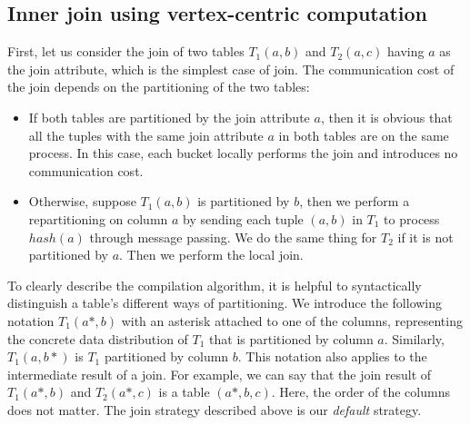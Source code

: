 \documentclass{sokendai_thesis} %
\begin{document}
\subsection{Inner join using vertex-centric computation}
\label{sec:join-two}

First, let us consider the join of two tables $T_1(a, b)$ and $T_2(a, c)$ having $a$ as the join attribute, which is the simplest case of join.
The communication cost of the join depends on the partitioning of the two tables:
\begin{itemize}
\item
  If both tables are partitioned by the join attribute $a$, then it is obvious that all the tuples with the same join attribute $a$ in both tables are on the same process.
  In this case, each bucket locally performs the join and introduces no communication cost.
\item
  Otherwise, suppose $T_1(a, b)$ is partitioned by $b$, then we perform a repartitioning on column $a$ by sending each tuple $(a, b)$ in $T_1$ to process $hash(a)$ through message passing.
  We do the same thing for $T_2$ if it is not partitioned by $a$.
  Then we perform the local join.
\end{itemize}

To clearly describe the compilation algorithm, it is helpful to syntactically distinguish a table's different ways of partitioning.
We introduce the following notation $T_1(a*, b)$ with an asterisk attached to one of the columns, representing the concrete data distribution of $T_1$ that is partitioned by column $a$.
Similarly, $T_1(a, b*)$ is $T_1$ partitioned by column $b$.
This notation also applies to the intermediate result of a join.
For example, we can say that the join result of $T_1(a*, b)$ and $T_2(a*, c)$ is a table $(a*, b, c)$.
Here, the order of the columns does not matter.
The join strategy described above is our \emph{default} strategy.

\end{document}
